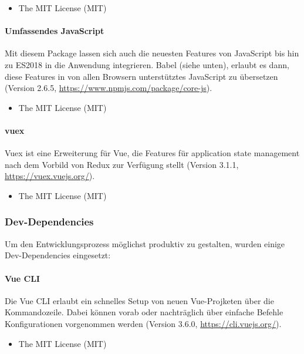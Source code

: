 	\begin{itemize}
		\item The MIT License (MIT)
	\end{itemize}

	\paragraph{Umfassendes JavaScript}
	Mit diesem Package lassen sich auch die neuesten Features von JavaScript bis hin zu ES2018 in die Anwendung integrieren. Babel (siehe unten), erlaubt es dann, diese Features in von allen Browsern unterstütztes JavaScript zu übersetzen (Version 2.6.5, \url{https://www.npmjs.com/package/core-js}).
	
	\begin{itemize}
		\item The MIT License (MIT)
	\end{itemize}

	\paragraph{vuex}
	Vuex ist eine Erweiterung für Vue, die Features für application state management nach dem Vorbild von Redux zur Verfügung stellt (Version 3.1.1, \url{https://vuex.vuejs.org/}).
	
	\begin{itemize}
		\item The MIT License (MIT)
	\end{itemize}

\subsubsection{Dev-Dependencies}
Um den Entwicklungsprozess möglichst produktiv zu gestalten, wurden einige Dev-Dependencies eingesetzt:

	\paragraph{Vue CLI}
	Die Vue CLI erlaubt ein schnelles Setup von neuen Vue-Projketen über die Kommandozeile. Dabei können vorab oder nachträglich über einfache Befehle Konfigurationen vorgenommen werden (Version 3.6.0, \url{https://cli.vuejs.org/}).
	
	\begin{itemize}
		\item The MIT License (MIT)
	\end{itemize}

